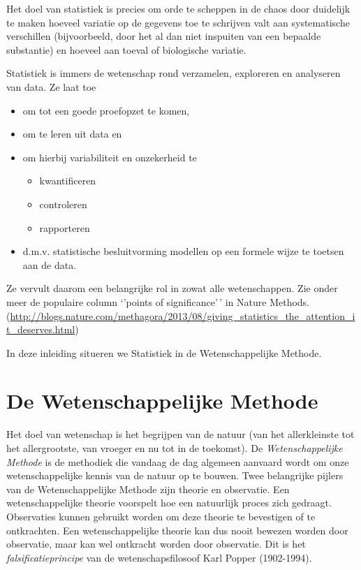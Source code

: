 \documentclass[
  12pt,dutch]{book}
\providecommand{\tightlist}{%
  \setlength{\itemsep}{0pt}\setlength{\parskip}{0pt}}
\theoremstyle{definition}
\theoremstyle{definition}
\theoremstyle{definition}
\theoremstyle{definition}
\theoremstyle{remark}
\begin{document}
Het doel van statistiek is precies om orde te scheppen in de chaos door duidelijk te maken hoeveel variatie op de gegevens toe te schrijven valt aan systematische verschillen (bijvoorbeeld, door het al dan niet inspuiten van een bepaalde substantie) en hoeveel aan toeval of biologische variatie.

Statistiek is immers de wetenschap rond verzamelen, exploreren en analyseren van data. Ze laat toe

\begin{itemize}
\tightlist
\item
  om tot een goede proefopzet te komen,
\item
  om te leren uit data en
\item
  om hierbij variabiliteit en onzekerheid te

  \begin{itemize}
  \tightlist
  \item
    kwantificeren
  \item
    controleren
  \item
    rapporteren
  \end{itemize}
\item
  d.m.v. statistische besluitvorming modellen op een formele wijze te toetsen aan de data.
\end{itemize}

Ze vervult daarom een belangrijke rol in zowat alle wetenschappen. Zie onder meer de populaire column `'points of significance'\,' in Nature Methods. (\url{http://blogs.nature.com/methagora/2013/08/giving_statistics_the_attention_it_deserves.html})

In deze inleiding situeren we Statistiek in de Wetenschappelijke Methode.

\section{De Wetenschappelijke Methode}\label{sec:wetMeth}

Het doel van wetenschap is het begrijpen van de natuur (van het allerkleinste tot het allergrootste, van vroeger en nu tot in de toekomst). De \emph{Wetenschappelijke Methode} is de methodiek die vandaag de dag algemeen aanvaard wordt om onze wetenschappelijke kennis van de natuur op te bouwen. Twee belangrijke pijlers van de Wetenschappelijke Methode zijn theorie en observatie. Een wetenschappelijke theorie voorspelt hoe een natuurlijk proces zich gedraagt. Observaties kunnen gebruikt worden om deze theorie te bevestigen of te ontkrachten. Een wetenschappelijke theorie kan dus nooit bewezen worden door observatie, maar kan wel ontkracht worden door observatie. Dit is het \emph{falsificatieprincipe} van de wetenschapsfilosoof Karl Popper (1902-1994).
\end{document}
